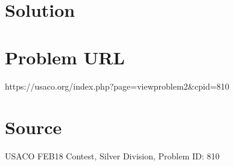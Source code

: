 \documentclass[12pt]{article}
\begin{document}
\section*{Solution}


\section*{Problem URL}
https://usaco.org/index.php?page=viewproblem2&cpid=810

\section*{Source}
USACO FEB18 Contest, Silver Division, Problem ID: 810
\end{document}
